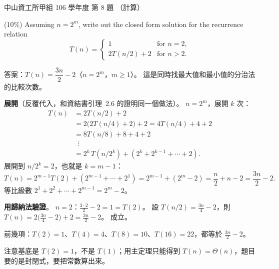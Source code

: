 \begin{pastexam}[label={px:nsysu-106-osds-03}]{中山資工所甲組 106 學年度 第 8 題}
（計算）

(10\%) Assuming $n=2^m$, write out the closed form solution for the recurrence relation
\[
T(n)=\begin{cases} 1 & \text{for } n=2,\\ 2T(n/2)+2 & \text{for } n>2.\end{cases}
\]
\end{pastexam}

\begin{pastsoln}
答案：$T(n) = \dfrac{3n}{2} - 2$（$n = 2^m$，$m \ge 1$）。 這是同時找最大值和最小值的分治法的比較次數。

\textbf{展開}（反覆代入，和資結書引理~2.6 的證明同一個做法）。 $n = 2^m$，展開 $k$ 次：
\begin{align*}
T(n) &= 2T(n/2) + 2\\
&= 2\bigl(2T(n/4) + 2\bigr) + 2 = 4T(n/4) + 4 + 2\\
&= 8T(n/8) + 8 + 4 + 2\\
&\;\;\vdots\\
&= 2^k\, T(n/2^k) + (2^k + 2^{k-1} + \cdots + 2).
\end{align*}
展開到 $n/2^k = 2$，也就是 $k = m - 1$：
\[
T(n) = 2^{m-1} T(2) + (2^{m-1} + \cdots + 2^1) = 2^{m-1} + (2^m - 2) = \frac{n}{2} + n - 2 = \frac{3n}{2} - 2.
\]
等比級數 $2^1 + 2^2 + \cdots + 2^{m-1} = 2^m - 2$。

\textbf{用歸納法驗證}。 $n = 2$：$\frac{3 \cdot 2}{2} - 2 = 1 = T(2)$。 設 $T(n/2) = \frac{3n}{4} - 2$，則
$T(n) = 2\bigl(\frac{3n}{4} - 2\bigr) + 2 = \frac{3n}{2} - 2$。 成立。

前幾項：$T(2) = 1$、$T(4) = 4$、$T(8) = 10$、$T(16) = 22$，都等於 $\frac{3n}{2} - 2$。

注意基底是 $T(2) = 1$，不是 $T(1)$；用主定理只能得到 $T(n) = \Theta(n)$，題目要的是封閉式，要把常數算出來。
\end{pastsoln}

